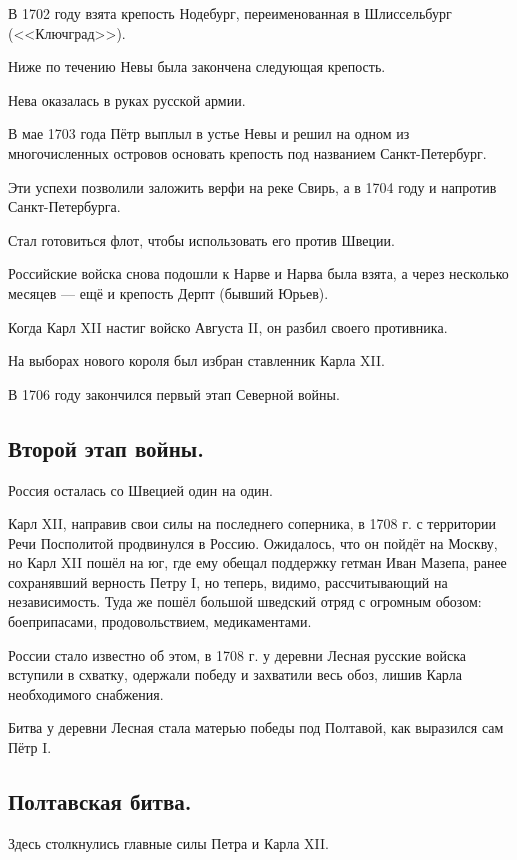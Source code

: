 В 1702 году взята крепость Нодебург, переименованная в Шлиссельбург (<<Ключград>>). 

Ниже по течению Невы была закончена следующая крепость. 

Нева оказалась в руках русской армии.

В мае 1703 года Пётр выплыл в устье Невы и решил на одном из многочисленных островов основать крепость под названием Санкт-Петербург. 

Эти успехи позволили заложить верфи на реке Свирь, а в 1704 году и напротив Санкт-Петербурга. 

Стал готовиться флот, чтобы использовать его против Швеции. 

Российские войска снова подошли к Нарве и Нарва была взята, а через несколько месяцев — ещё и крепость Дерпт (бывший Юрьев).

Когда Карл XII настиг войско Августа II, он разбил своего противника. 

На выборах нового короля был избран ставленник Карла XII. 

В 1706 году закончился первый этап Северной войны. 

\subsection{Второй этап войны.}

Россия осталась со Швецией один на один. 

Карл XII, направив свои силы на последнего соперника, в 1708 г. с территории Речи Посполитой продвинулся в Россию. Ожидалось, что он пойдёт на Москву, но Карл XII пошёл на юг, где ему обещал поддержку гетман Иван Мазепа, ранее сохранявший верность Петру I, но теперь, видимо, рассчитывающий на независимость. Туда же пошёл большой шведский отряд с огромным обозом: боеприпасами, продовольствием, медикаментами. 

России стало известно об этом, в 1708 г. у деревни Лесная русские войска вступили в схватку, одержали победу и захватили весь обоз, лишив Карла необходимого снабжения.

Битва у деревни Лесная стала матерью победы под Полтавой, как выразился сам Пётр I.

\subsection{Полтавская битва.}

Здесь столкнулись главные силы Петра и Карла XII. 

